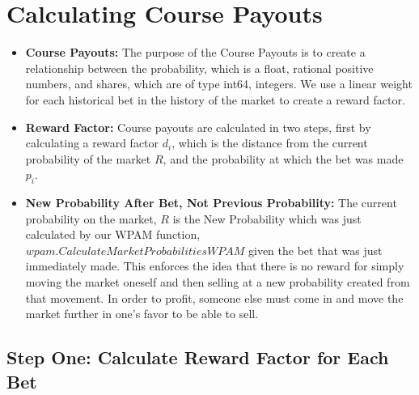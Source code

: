 \documentclass{article}
\begin{document}
\begin{center}
\end{center}


\begin{center}
\end{center}


\section*{Calculating Course Payouts}

\begin{itemize}
    \item \textbf{Course Payouts:} The purpose of the Course Payouts is to create a relationship between the probability, which is a float, rational positive numbers, and shares, which are of type int64, integers. We use a linear weight for each historical bet in the history of the market to create a reward factor.
    \item \textbf{Reward Factor:} Course payouts are calculated in two steps, first by calculating a reward factor \(d_i\), which is the distance from the current probability of the market \(R\), and the probability at which the bet was made \(p_i\).
    \item \textbf{New Probability After Bet, Not Previous Probability:} The current probability on the market, \(R\) is the New Probability which was just calculated by our WPAM function, \(wpam.CalculateMarketProbabilitiesWPAM\) given the bet that was just immediately made. This enforces the idea that there is no reward for simply moving the market oneself and then selling at a new probability created from that movement. In order to profit, someone else must come in and move the market further in one's favor to be able to sell.
\end{itemize}

\subsection*{Step One: Calculate Reward Factor for Each Bet}
\end{document}
